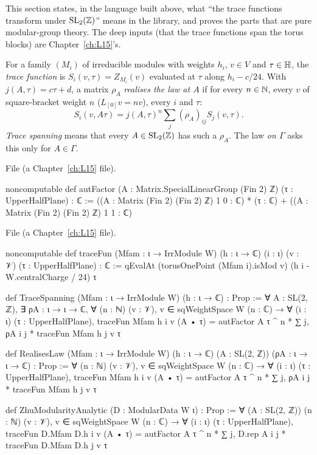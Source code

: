 This section states, in the language built above, what ``the trace functions transform under $\mathrm{SL}_2(\mathbb{Z})$'' means in the
library, and proves the parts that are pure modular-group theory. The deep inputs (that the trace functions span the torus
blocks) are Chapter~\ref{ch:L15}'s.

\begin{definition}\label{l14:def:realises}
For a family $(M_i)$ of irreducible modules with weights $h_i$, $v\in V$ and $\tau\in\mathbb{H}$, the \emph{trace function}
is $S_i(v,\tau) = Z_{M_i}(v)$ evaluated at $\tau$ along $h_i - c/24$. With $j(A,\tau) = c\tau+d$, a matrix $\rho_A$
\emph{realises the law at $A$} if for every $n\in{\mathbb{N}}$, every $v$ of square-bracket weight $n$ ($L_{[0]}v = nv$), every $i$ and
$\tau$:
\begin{equation*}
  S_i(v,A\tau) = j(A,\tau)^n\sum_j(\rho_A)_{ij}S_j(v,\tau).
\end{equation*}
\emph{Trace spanning} means that every $A\in\mathrm{SL}_2(\mathbb{Z})$ has such a $\rho_A$. The law \emph{on $\Gamma$} asks this only for
$A\in\Gamma$.
\end{definition}
\noindent File  (a Chapter~\ref{ch:L15} file).
\begin{leancode}
noncomputable def autFactor (A : Matrix.SpecialLinearGroup (Fin 2) ℤ) (τ : UpperHalfPlane) : ℂ :=
  ((A : Matrix (Fin 2) (Fin 2) ℤ) 1 0 : ℂ) * (τ : ℂ)
    + ((A : Matrix (Fin 2) (Fin 2) ℤ) 1 1 : ℂ)
\end{leancode}
\noindent File  (a Chapter~\ref{ch:L15} file).
\begin{leancode}
noncomputable def traceFun (Mfam : ι → IrrModule W) (h : ι → ℂ) (i : ι) (v : 𝒱)
    (τ : UpperHalfPlane) : ℂ :=
  qEvalAt (torusOnePoint (Mfam i).isMod v) (h i - W.centralCharge / 24) τ

def TraceSpanning (Mfam : ι → IrrModule W) (h : ι → ℂ) : Prop :=
  ∀ A : SL(2, ℤ), ∃ ρA : ι → ι → ℂ, ∀ (n : ℕ) (v : 𝒱), v ∈ sqWeightSpace W (n : ℂ) →
    ∀ (i : ι) (τ : UpperHalfPlane),
      traceFun Mfam h i v (A • τ) = autFactor A τ ^ n * ∑ j, ρA i j * traceFun Mfam h j v τ

def RealisesLaw (Mfam : ι → IrrModule W) (h : ι → ℂ) (A : SL(2, ℤ)) (ρA : ι → ι → ℂ) : Prop :=
  ∀ (n : ℕ) (v : 𝒱), v ∈ sqWeightSpace W (n : ℂ) → ∀ (i : ι) (τ : UpperHalfPlane),
    traceFun Mfam h i v (A • τ) = autFactor A τ ^ n * ∑ j, ρA i j * traceFun Mfam h j v τ

def ZhuModularityAnalytic (D : ModularData W ι) : Prop :=
  ∀ (A : SL(2, ℤ)) (n : ℕ) (v : 𝒱), v ∈ sqWeightSpace W (n : ℂ) → ∀ (i : ι) (τ : UpperHalfPlane),
    traceFun D.Mfam D.h i v (A • τ)
      = autFactor A τ ^ n * ∑ j, D.rep A i j * traceFun D.Mfam D.h j v τ
\end{leancode}

